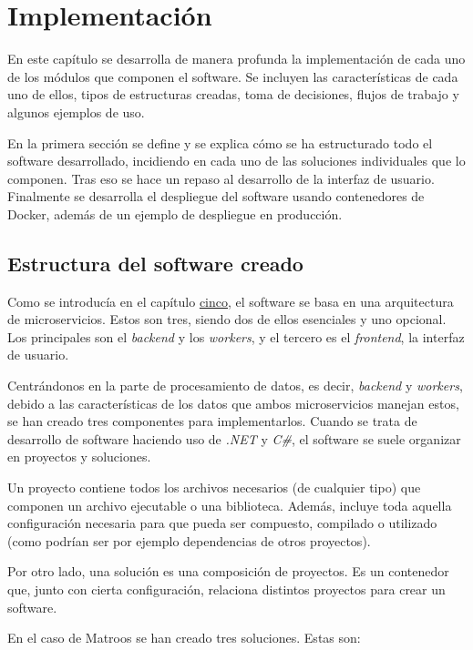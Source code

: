 \chapter{Implementación}

En este capítulo se desarrolla de manera profunda la implementación de cada uno de los módulos que componen el software. Se incluyen las características de cada uno de ellos, tipos de estructuras creadas, toma de decisiones, flujos de trabajo y algunos ejemplos de uso.

En la primera sección se define y se explica cómo se ha estructurado todo el software desarrollado, incidiendo en cada uno de las soluciones individuales que lo componen. Tras eso se hace un repaso al desarrollo de la interfaz de usuario. Finalmente se desarrolla el despliegue del software usando contenedores de Docker, además de un ejemplo de despliegue en producción.


\section{Estructura del software creado}

Como se introducía en el capítulo \hyperref[cap:5]{cinco}, el software se basa en una arquitectura de microservicios. Estos son tres, siendo dos de ellos esenciales y uno opcional. Los principales son el \textit{backend} y los \textit{workers}, y el tercero es el \textit{frontend}, la interfaz de usuario.

Centrándonos en la parte de procesamiento de datos, es decir, \textit{backend} y \textit{workers}, debido a las características de los datos que ambos microservicios manejan estos, se han creado tres componentes para implementarlos. Cuando se trata de desarrollo de software haciendo uso de \textit{.NET} y \textit{C\#}, el software se suele organizar en proyectos y soluciones.

Un proyecto contiene todos los archivos necesarios (de cualquier tipo) que componen un archivo ejecutable o una biblioteca. Además, incluye toda aquella configuración necesaria para que pueda ser compuesto, compilado o utilizado (como podrían ser por ejemplo dependencias de otros proyectos).

Por otro lado, una solución es una composición de proyectos. Es un contenedor que, junto con cierta configuración, relaciona distintos proyectos para crear un software.

En el caso de Matroos se han creado tres soluciones. Estas son:

